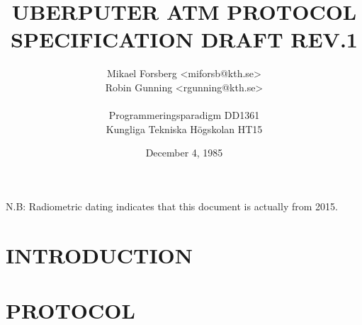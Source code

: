 \documentclass[a4paper,11pt]{article}
\newcommand{\resetfont}{\renewcommand{\familydefault}{lmtt}\normalfont}
\begin{document}
\resetfont
\title{\vspace{-1cm} \Huge UBERPUTER ATM PROTOCOL SPECIFICATION DRAFT REV.1}
\author{Mikael Forsberg <miforsb@kth.se>\\ Robin Gunning <rgunning@kth.se>\\ $\quad$\\ \small Programmeringsparadigm DD1361\\ \small Kungliga Tekniska Högskolan HT15}
\date{December 4, 1985}
\maketitle
\vfill \small
N.B: Radiometric dating indicates that this document is actually from 2015.
\newpage
$\quad$

\newpage
\tableofcontents
\newpage
{}
\section{INTRODUCTION}
\section{PROTOCOL}
\end{document}
